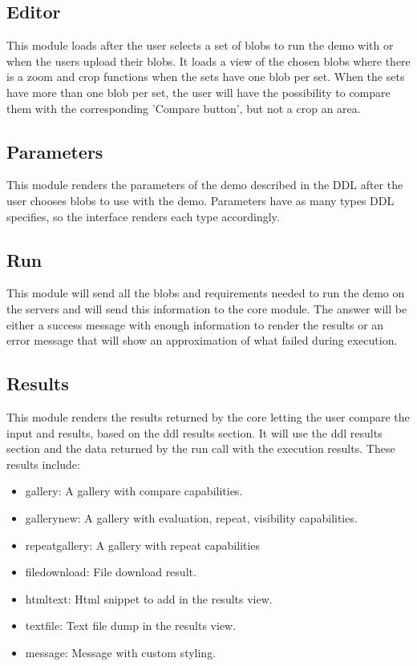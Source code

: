 \subsection{Editor}
This module loads after the user selects a set of blobs to run the demo with or when the users upload their blobs. It loads a view of
the chosen blobs where there is a zoom and crop functions when the sets have one blob per set. When the sets have more than 
one blob per set, the user will have the possibility to compare them with the corresponding 'Compare button', but not a crop 
an area.

\subsection{Parameters}
This module renders the parameters of the demo described in the DDL after the user chooses blobs to use with the demo. 
Parameters have as many types DDL specifies, so the interface renders each type accordingly.

\subsection{Run}
This module will send all the blobs and requirements needed to run the demo on the servers and will send this information to 
the core module. The answer will be either a success message with enough information to render the results or an error message 
that will show an approximation of what failed during execution.

\subsection{Results}
This module renders the results returned by the core letting the user compare the input and results, based on the ddl results section. 
It will use the ddl results section and the data returned by the run call with the execution results. These results include:

\begin{itemize}
	\item gallery: A gallery with compare capabilities.
	\item gallery\textunderscore new: A gallery with evaluation, repeat, visibility capabilities.
	\item repeat\textunderscore gallery: A gallery with repeat capabilities
	\item file\textunderscore download: File download result.
	\item html\textunderscore text: Html snippet to add in the results view.
	\item text\textunderscore file: Text file dump in the results view.
	\item message: Message with custom styling.
\end{itemize}

